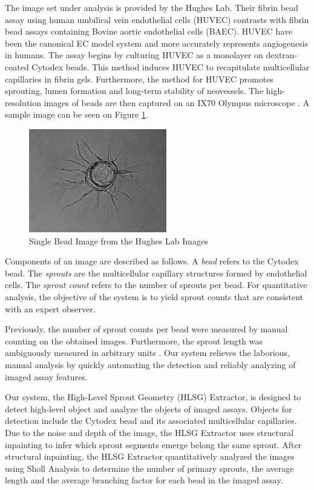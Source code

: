 \documentclass{sig-alternate}
\begin{document}
	The image set under analysis is provided by the Hughes Lab. Their
	fibrin bead assay using human umbilical vein endothelial cells (HUVEC)
	contrasts with fibrin bead assays containing Bovine aortic endothelial
	cells (BAEC). HUVEC have been the canonical EC model system and more
	accurately represents angiogenesis in humans. The assay begins by
	culturing HUVEC as a monolayer on dextran-coated Cytodex beads. This
	method induces HUVEC to recapitulate multicellular capillaries in
	fibrin gels. Furthermore, the method for HUVEC promotes sprouting,
	lumen formation and long-term stability of neovessels. The
	high-resolution images of beads are then captured on an IX70 Olympus
	microscope \cite{nakatsu03}. A sample image can be seen on Figure
	\ref{fig:monobead}.

	\begin{figure}[ht]
		\centering
		\includegraphics[width=6cm]{images/mono.jpg}
		\caption{Single Bead Image from the Hughes Lab Images}
		\label{fig:monobead}
	\end{figure}

	Components of an image are described as follows. A \emph{bead} refers
	to the Cytodex bead. The \emph{sprouts} are the multicellular
	capillary structures formed by endothelial cells. The \emph{sprout
	count} refers to the number of sprouts per bead. For quantitative
	analysis, the objective of the system is to yield sprout counts that
	are consistent with an expert observer.

	Previously, the number of sprout counts per bead were measured by manual
	counting on the obtained images. Furthermore, the sprout length was
	ambiguously measured in arbitrary units \cite{nakatsu03}. Our system
	relieves the laborious, manual analysis by quickly automating the detection
	and reliably analyzing of imaged assay features.

	Our system, the High-Level Sprout Geometry (HLSG) Extractor, is
	designed to detect high-level object and analyze the objects of imaged
	assays. Objects for detection include the Cytodex bead and its
	associated multicellular capillaries. Due to the noise and depth of
	the image, the HLSG Extractor uses structural inpainting to infer
	which sprout segments emerge belong the same sprout. After structural
	inpainting, the HLSG Extractor quantitatively analyzed the images
	using Sholl Analysis to determine the number of primary sprouts, the
	average length and the average branching factor for each bead in the
	imaged assay.
\end{document}
